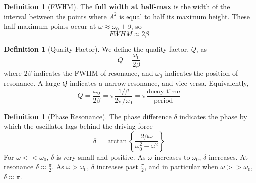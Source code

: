 \documentclass[12pt]{article}
\theoremstyle{definition}
\newtheorem{defn}[thm]{Definition}
\theoremstyle{remark}
\numberwithin{equation}{section}
\newcommand\B[1]{\textbf{#1}}
\begin{document}
\begin{defn}[FWHM]
        The \B{full width at half-max} is the width of the interval between the points where $A^2$ is equal to half its maximum height. These half maximum points occur at $\omega \approx \omega_0 \pm \beta$, so \begin{equation}
                FWHM \approx 2\beta
        \end{equation}
\end{defn}


\vspace{15pt}

\begin{defn}[Quality Factor]
        We define the quality factor, $Q$, as \begin{equation}
                Q = \frac{\omega_0}{2\beta}
        \end{equation}
        where $2\beta$ indicates the FWHM of resonance, and $\omega_0$ indicates the position of resonance. A large $Q$ indicates a narrow resonance, and vice-versa. Equivalently, \begin{equation}
                Q = \frac{\omega_0}{2\beta} = \pi\frac{1/\beta}{2\pi/\omega_0} = \pi\frac{\text{decay time}}{\text{period}}
        \end{equation}
\end{defn}

\vspace{15pt}


\begin{defn}[Phase Resonance]
        The phase difference $\delta$ indicates the phase by which the oscillator lags behind the driving force \begin{equation}
                \delta = \arctan\left\{\frac{2\beta\omega}{\omega_0^2-\omega^2}\right\}
        \end{equation}
        For $\omega << \omega_0$, $\delta$ is very small and positive. As $\omega$ increases to $\omega_0$, $\delta$ increases. At resonance $\delta \approx \frac{\pi}{2}$. As $\omega > \omega_0$, $\delta$ increases past $\frac{\pi}{2}$, and in particular when $\omega >> \omega_0$, $\delta \approx \pi$.
\end{defn}




        





\end{document}
